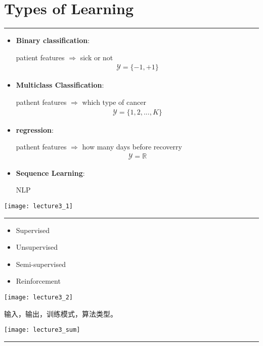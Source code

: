 \section{Types of Learning} %
\noindent
{\color{LightRubineRed} \rule{\linewidth}{1mm} }
\begin{itemize}
\item \textbf{Binary classification}:\par
patient features $\Rightarrow$ sick or not 
\begin{align}
\mathcal{Y} = \{-1,+1\}
\end{align}
\item \textbf{Multiclass Classification}: \par
pathent features $\Rightarrow$ which type of cancer 
\begin{align}
\mathcal{Y} = \{1,2,...,K\}
\end{align}
\item \textbf{regression}: \par
pathent features $\Rightarrow$ how many days before recoverry 
\begin{align}
\mathcal{Y} = \mathbb{R}
\end{align}
\item \textbf{Sequence Learning}: \par
NLP
\end{itemize}
\begin{center}
\texttt{[image: lecture3\_1]}\\
\end{center}
\noindent
{\color{LightRubineRed} \rule{\linewidth}{1mm} }
\begin{itemize}
\item Supervised \par
\item Unsupervised \par
\item Semi-supervised \par
\item Reinforcement
\end{itemize}
\begin{center}
\texttt{[image: lecture3\_2]}\\
\end{center}
输入，输出，训练模式，算法类型。
\begin{center}
\texttt{[image: lecture3\_sum]}\\
\end{center}
\noindent
{\color{RubineRed} \rule{\linewidth}{1mm} }